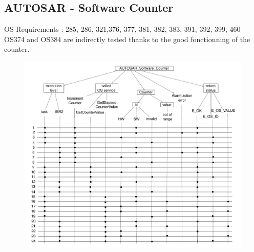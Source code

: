\documentclass[10pt]{article}
\newlength{\Li}\settowidth{\Li}{Case}
\newlength{\Lii}\setlength{\Lii}{7cm}
\newlength{\Liii}\setlength{\Liii}{\textwidth} \addtolength{\Liii}{-\Li} \addtolength{\Liii}{-\Lii}
\newlength{\Liiii}\setlength{\Liiii}{\textwidth} \addtolength{\Liiii}{-\Li}
\begin{document}
	\subsection{AUTOSAR - Software Counter}
	OS Requirements : 285, 286, 321,376, 377, 381, 382, 383, 391, 392, 399, 460\\
	OS374 and  OS384 are indirectly tested thanks to the good fonctionning of the counter.\\ 
	
	\begin{figure}[htbp] %
   		\centering
		\includegraphics[width=1\textwidth, angle=0]{graphics/AUTOSAR_Software_Counter.pdf}
	\end{figure}

\setlength{\Lii}{7cm}
\setlength{\Liii}{\textwidth} \addtolength{\Liii}{-\Li} \addtolength{\Liii}{-\Lii} \addtolength{\Liii}{-\Liiiii}
\end{document}
